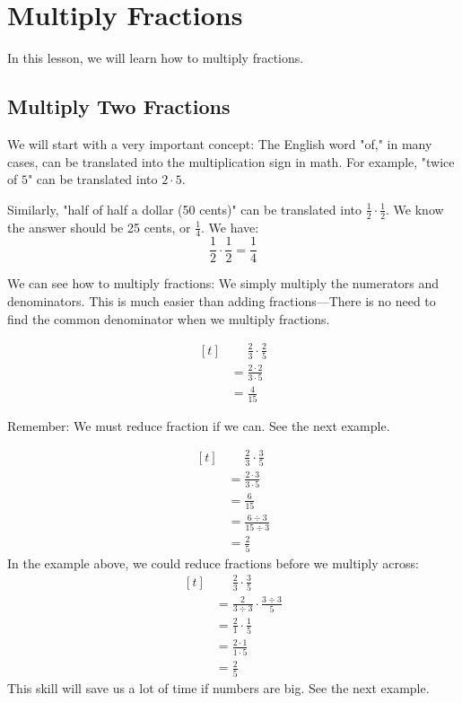 
\section{Multiply Fractions}

In this lesson, we will learn how to multiply fractions.

\subsection{Multiply Two Fractions}

We will start with a very important concept: The English word "of," in many cases, can be translated into the multiplication sign in math. For example, "twice of $5$" can be translated into $2\cdot5$.

Similarly, "half of half a dollar (50 cents)" can be translated into $\frac{1}{2}\cdot\frac{1}{2}$. We know the answer should be 25 cents, or $\frac{1}{4}$. We have:
\[ \frac{1}{2}\cdot\frac{1}{2}=\frac{1}{4} \]

We can see how to multiply fractions: We simply multiply the numerators and denominators. This is much easier than adding fractions---There is no need to find the common denominator when we multiply fractions.

\begin{myexample}
\[ 
\begin{aligned}[t]
	&\phantom{{}=}\frac{2}{3} \cdot \frac{2}{5} \\
	&= \frac{2\cdot2}{3\cdot5} \\
	&= \frac{4}{15}
\end{aligned}
\]
\end{myexample}

Remember: We must reduce fraction if we can. See the next example.

\begin{myexample}
\[ 
\begin{aligned}[t]
	&\phantom{{}=}\frac{2}{3} \cdot \frac{3}{5} \\
	&= \frac{2\cdot3}{3\cdot5} \\
	&= \frac{6}{15} \\
	&= \frac{6\div3}{15\div3} \\
	&= \frac{2}{5}
\end{aligned}
\]
In the example above, we could reduce fractions before we multiply across:
\[ 
\begin{aligned}[t]
	&\phantom{{}=}\frac{2}{3} \cdot \frac{3}{5} \\
	&= \frac{2}{3\div3} \cdot \frac{3\div3}{5} \\
	&= \frac{2}{1} \cdot \frac{1}{5} \\
	&= \frac{2\cdot1}{1\cdot5} \\
	&= \frac{2}{5}
\end{aligned}
\]
This skill will save us a lot of time if numbers are big. See the next example.
\end{myexample}

